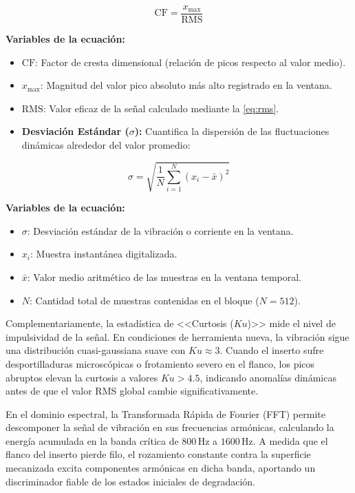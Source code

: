 \begin{equation}
\text{CF} = \frac{x_{\max}}{\text{RMS}}
\label{eq:factor_cresta}
\end{equation}

\noindent\textbf{Variables de la ecuación:}
\begin{itemize}
    \item $\text{CF}$: Factor de cresta dimensional (relación de picos respecto al valor medio).
    \item $x_{\max}$: Magnitud del valor pico absoluto más alto registrado en la ventana.
    \item $\text{RMS}$: Valor eficaz de la señal calculado mediante la \eqref{eq:rms}.
\end{itemize}

\begin{itemize}
    \item \textbf{Desviación Estándar ($\sigma$):} Cuantifica la dispersión de las fluctuaciones dinámicas alrededor del valor promedio:
\end{itemize}

\begin{equation}
\sigma = \sqrt{\frac{1}{N} \sum_{i=1}^{N} (x_i - \bar{x})^2}
\label{eq:desviacion_estandar}
\end{equation}

\noindent\textbf{Variables de la ecuación:}
\begin{itemize}
    \item $\sigma$: Desviación estándar de la vibración o corriente en la ventana.
    \item $x_i$: Muestra instantánea digitalizada.
    \item $\bar{x}$: Valor medio aritmético de las muestras en la ventana temporal.
    \item $N$: Cantidad total de muestras contenidas en el bloque ($N=512$).
\end{itemize}

Complementariamente, la estadística de <<Curtosis ($Ku$)>> mide el nivel de impulsividad de la señal. En condiciones de herramienta nueva, la vibración sigue una distribución cuasi-gaussiana suave con $Ku \approx 3$. Cuando el inserto sufre desportilladuras microscópicas o frotamiento severo en el flanco, los picos abruptos elevan la curtosis a valores $Ku > 4.5$, indicando anomalías dinámicas antes de que el valor RMS global cambie significativamente.

En el dominio espectral, la Transformada Rápida de Fourier (FFT) permite descomponer la señal de vibración en sus frecuencias armónicas, calculando la energía acumulada en la banda crítica de $800\,\text{Hz}$ a $1600\,\text{Hz}$. A medida que el flanco del inserto pierde filo, el rozamiento constante contra la superficie mecanizada excita componentes armónicas en dicha banda, aportando un discriminador fiable de los estados iniciales de degradación.

